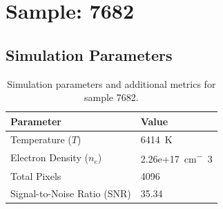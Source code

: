 \documentclass[a4paper,11pt]{article}
\begin{document}
\clearpage

\section{Sample: 7682}
\subsection{Simulation Parameters}
\begin{table}[h!]
    \centering
    \begin{tabular}{ll}
        \toprule
        \textbf{Parameter} & \textbf{Value} \\
        \midrule
        Temperature ($T$) & 6414 \,\si{K} \\
        Electron Density ($n_e$) & 2.26e+17 \,\si{cm^-3} \\
        Total Pixels & 4096 \\
        Signal-to-Noise Ratio (SNR) & 35.34 \\
        \bottomrule
    \end{tabular}
    \caption{Simulation parameters and additional metrics for sample 7682.}
    \label{tab:params_7682}
\end{table}
\end{document}
